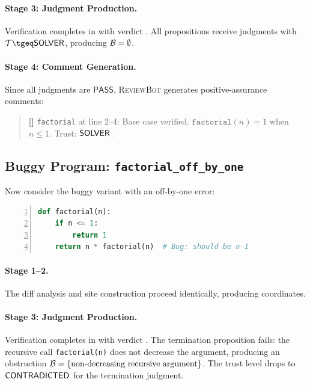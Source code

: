 \documentclass[11pt]{article}
\newcommand{\ReviewBot}{\textsc{ReviewBot}}
\newcommand{\SevPass}{\mathsf{PASS}}
\begin{document}
\paragraph{Stage 3: Judgment Production.}
Verification completes in \ppLXVIIrevfactorialTime{} with verdict
\ppLXVIIrevfactorialVerdict{}. All \ppLXVIIrevfactorialProps{} propositions
receive judgments with $\trust \tgeq \Tsolver$, producing $\mathcal{B} = \emptyset$.

\paragraph{Stage 4: Comment Generation.}
Since all judgments are $\SevPass$, \ReviewBot{} generates
\ppLXVIIrevfactorialProps{} positive-assurance comments:
\begin{quote}
\small
\textbf{[\SevPass{}]} \texttt{factorial} at line 2--4: Base case
verified. $\texttt{factorial}(n) = 1$ when $n \leq 1$. Trust: $\mathsf{SOLVER}$.
\end{quote}

\subsection{Buggy Program: \texttt{factorial\_off\_by\_one}}

Now consider the buggy variant with an off-by-one error:
\begin{lstlisting}[language=Python,basicstyle=\small\ttfamily,frame=single,
  xleftmargin=1em,numbers=left]
def factorial(n):
    if n <= 1:
        return 1
    return n * factorial(n)  # Bug: should be n-1
\end{lstlisting}

\paragraph{Stage 1--2.} The diff analysis and site construction proceed
identically, producing \ppLXVIIrevfactorialoffbyoneProps{} coordinates.

\paragraph{Stage 3: Judgment Production.}
Verification completes in \ppLXVIIrevfactorialoffbyoneTime{} with verdict
\ppLXVIIrevfactorialoffbyoneVerdict{}. The termination proposition
fails: the recursive call \texttt{factorial(n)} does not decrease the
argument, producing an obstruction $\mathcal{B} = \{\text{non-decreasing
recursive argument}\}$. The trust level drops to $\mathsf{CONTRADICTED}$ for the
termination judgment.
\end{document}
